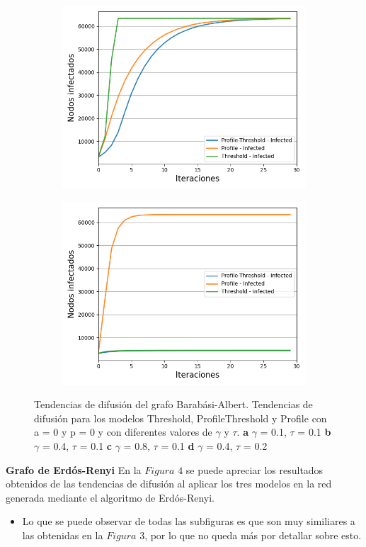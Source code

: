 \documentclass{article}
\begin{document}
\begin{figure}[!tbp]
\begin{subfigure}[b]{0.5\textwidth}
		\includegraphics[width=\textwidth]{../Images/Fig 1 c).png}
		\caption{}
		\label{fig:f3}
	\end{subfigure}
	\hfill
	\begin{subfigure}[b]{0.5\textwidth}
		\includegraphics[width=\textwidth]{../Images/Fig 1 d).png}
		\caption{}
		\label{fig:f4}
	\end{subfigure}
	\label{fig:figure1}
	\caption{Tendencias de difusión del grafo Barabási-Albert. Tendencias de difusión para los modelos Threshold, ProfileThreshold y Profile con a = 0 y p = 0 y con diferentes valores de $\gamma$ y $\tau$. \textbf{a} $\gamma$ = 0.1, $\tau$ = 0.1 \textbf{b} $\gamma$ = 0.4, $\tau$ = 0.1 \textbf{c} $\gamma$ = 0.8, $\tau$ = 0.1 \textbf{d} $\gamma$ = 0.4, $\tau$ = 0.2}
\end{figure}
\newpage
\textbf{Grafo de Erdós-Renyi}
En la $Figura$ $4$ se puede apreciar los resultados obtenidos de las tendencias de difusión al aplicar los tres modelos en la red generada mediante el algoritmo de Erdós-Renyi. 
\begin{itemize}
	\item Lo que se puede observar de todas las subfiguras es que son muy similiares a las obtenidas en la $Figura$ $3$, por lo que no queda más por detallar sobre esto.
\end{itemize}
\end{document}
